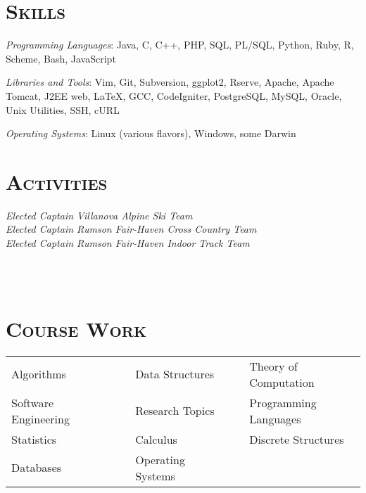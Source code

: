 \begin{resume}

\section{\textsc{Skills}}

\emph{Programming Languages}: Java, C, C++, PHP, SQL, PL/SQL, Python, Ruby, R,
Scheme, Bash, JavaScript

\emph{Libraries and Tools}: Vim, Git, Subversion, ggplot2, Rserve, Apache,
Apache Tomcat, J2EE web, LaTeX, GCC, CodeIgniter, PostgreSQL, MySQL,
Oracle, Unix Utilities, SSH, cURL

\emph{Operating Systems}: Linux (various flavors), Windows, some Darwin


\section{\textsc{Activities}}

\emph{Elected Captain Villanova Alpine Ski Team} \\
\emph{Elected Captain Rumson Fair-Haven Cross Country Team} \\
\emph{Elected Captain Rumson Fair-Haven Indoor Track Team} \\

\begin{formatb}
  \\
  \body\\
\end{formatb}



\section{\textsc{Course Work}}
  \begin{tabular}{lllll}

  Algorithms             & \ \ & Data Structures     & \ \ & Theory of Computation \\
  Software Engineering   & \ \ & Research Topics     & \ \ & Programming Languages \\
  Statistics             & \ \ & Calculus            & \ \ & Discrete Structures \\
  Databases              & \ \ & Operating Systems   & \ \ & 

  \end{tabular}

\end{resume}

